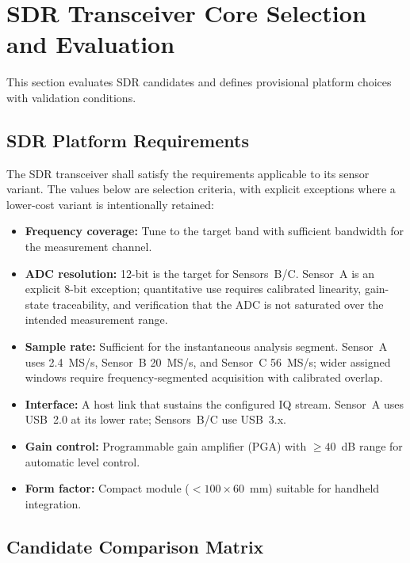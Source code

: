 \documentclass[11pt,a4paper]{article}
\begin{document}
\section{SDR Transceiver Core Selection and Evaluation}
\label{sec:sdr_selection}

This section evaluates SDR candidates and defines provisional platform choices with validation conditions.

\subsection{SDR Platform Requirements}

The SDR transceiver shall satisfy the requirements applicable to its sensor variant. The values below are selection criteria, with explicit exceptions where a lower-cost variant is intentionally retained:

\begin{itemize}
    \item \textbf{Frequency coverage:} Tune to the target band with sufficient bandwidth for the measurement channel.
    \item \textbf{ADC resolution:} 12-bit is the target for Sensors~B/C. Sensor~A is an explicit 8-bit exception; quantitative use requires calibrated linearity, gain-state traceability, and verification that the ADC is not saturated over the intended measurement range.
    \item \textbf{Sample rate:} Sufficient for the instantaneous analysis segment. Sensor~A uses 2.4~MS/s, Sensor~B 20~MS/s, and Sensor~C 56~MS/s; wider assigned windows require frequency-segmented acquisition with calibrated overlap.
    \item \textbf{Interface:} A host link that sustains the configured IQ stream. Sensor~A uses USB~2.0 at its lower rate; Sensors~B/C use USB~3.x.
    \item \textbf{Gain control:} Programmable gain amplifier (PGA) with $\geq 40$~dB range for automatic level control.
    \item \textbf{Form factor:} Compact module ($< 100 \times 60$~mm) suitable for handheld integration.
\end{itemize}

\subsection{Candidate Comparison Matrix}
\end{document}
